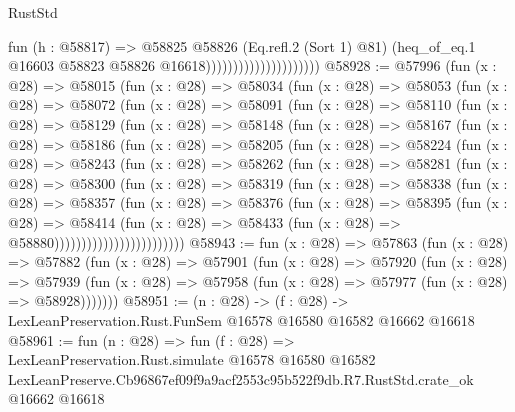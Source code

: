 \begin{lexlean}{RustStd}
\begin{coremodule}
                                          fun (h : @58817) =>
                                          @58825
                                            @58826
                                            (Eq.refl.{2} (Sort 1) @81)
                                            (heq_of_eq.{1}
                                              @16603
                                              @58823
                                              @58826
                                              @16618)))))))))))))))))))))
@58928 := @57996
    (fun (x : @28) =>
    @58015
      (fun (x : @28) =>
      @58034
        (fun (x : @28) =>
        @58053
          (fun (x : @28) =>
          @58072
            (fun (x : @28) =>
            @58091
              (fun (x : @28) =>
              @58110
                (fun (x : @28) =>
                @58129
                  (fun (x : @28) =>
                  @58148
                    (fun (x : @28) =>
                    @58167
                      (fun (x : @28) =>
                      @58186
                        (fun (x : @28) =>
                        @58205
                          (fun (x : @28) =>
                          @58224
                            (fun (x : @28) =>
                            @58243
                              (fun (x : @28) =>
                              @58262
                                (fun (x : @28) =>
                                @58281
                                  (fun (x : @28) =>
                                  @58300
                                    (fun (x : @28) =>
                                    @58319
                                      (fun (x : @28) =>
                                      @58338
                                        (fun (x : @28) =>
                                        @58357
                                          (fun (x : @28) =>
                                          @58376
                                            (fun (x : @28) =>
                                            @58395
                                              (fun (x : @28) =>
                                              @58414
                                                (fun (x : @28) =>
                                                @58433
                                                  (fun (x : @28) => @58880))))))))))))))))))))))))
@58943 := fun (x : @28) =>
  @57863
    (fun (x : @28) =>
    @57882
      (fun (x : @28) =>
      @57901
        (fun (x : @28) =>
        @57920
          (fun (x : @28) =>
          @57939 (fun (x : @28) => @57958 (fun (x : @28) => @57977 (fun (x : @28) => @58928)))))))
@58951 := (n : @28) ->
  (f : @28) -> LexLeanPreservation.Rust.FunSem @16578 @16580 @16582 @16662 @16618
@58961 := fun (n : @28) =>
  fun (f : @28) =>
  LexLeanPreservation.Rust.simulate
    @16578
    @16580
    @16582
    LexLeanPreserve.Cb96867ef09f9a9acf2553c95b522f9db.R7.RustStd.crate_ok
    @16662
    @16618
\end{coremodule}
\end{lexlean}
